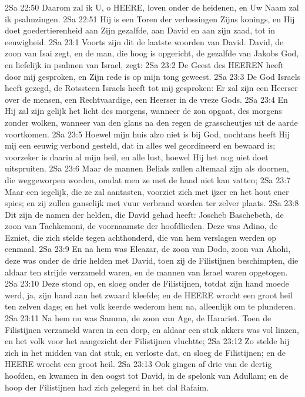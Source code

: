 2Sa 22:50  Daarom zal ik U, o HEERE, loven onder de heidenen, en Uw Naam zal ik psalmzingen.
2Sa 22:51  Hij is een Toren der verlossingen Zijns konings, en Hij doet goedertierenheid aan Zijn gezalfde, aan David en aan zijn zaad, tot in eeuwigheid.
2Sa 23:1  Voorts zijn dit de laatste woorden van David. David, de zoon van Isai zegt, en de man, die hoog is opgericht, de gezalfde van Jakobs God, en liefelijk in psalmen van Israel, zegt:
2Sa 23:2  De Geest des HEEREN heeft door mij gesproken, en Zijn rede is op mijn tong geweest.
2Sa 23:3  De God Israels heeft gezegd, de Rotssteen Israels heeft tot mij gesproken: Er zal zijn een Heerser over de mensen, een Rechtvaardige, een Heerser in de vreze Gods.
2Sa 23:4  En Hij zal zijn gelijk het licht des morgens, wanneer de zon opgaat, des morgens zonder wolken, wanneer van den glans na den regen de grasscheutjes uit de aarde voortkomen.
2Sa 23:5  Hoewel mijn huis alzo niet is bij God, nochtans heeft Hij mij een eeuwig verbond gesteld, dat in alles wel geordineerd en bewaard is; voorzeker is daarin al mijn heil, en alle lust, hoewel Hij het nog niet doet uitspruiten.
2Sa 23:6  Maar de mannen Belials zullen altemaal zijn als doornen, die weggeworpen worden, omdat men ze met de hand niet kan vatten;
2Sa 23:7  Maar een iegelijk, die ze zal aantasten, voorziet zich met ijzer en het hout ener spies; en zij zullen ganselijk met vuur verbrand worden ter zelver plaats.
2Sa 23:8  Dit zijn de namen der helden, die David gehad heeft: Joscheb Baschebeth, de zoon van Tachkemoni, de voornaamste der hoofdlieden. Deze was Adino, de Ezniet, die zich stelde tegen achthonderd, die van hem verslagen werden op eenmaal.
2Sa 23:9  En na hem was Eleazar, de zoon van Dodo, zoon van Ahohi, deze was onder de drie helden met David, toen zij de Filistijnen beschimpten, die aldaar ten strijde verzameld waren, en de mannen van Israel waren opgetogen.
2Sa 23:10  Deze stond op, en sloeg onder de Filistijnen, totdat zijn hand moede werd, ja, zijn hand aan het zwaard kleefde; en de HEERE wrocht een groot heil ten zelven dage; en het volk keerde wederom hem na, alleenlijk om te plunderen.
2Sa 23:11  Na hem nu was Samma, de zoon van Age, de Harariet. Toen de Filistijnen verzameld waren in een dorp, en aldaar een stuk akkers was vol linzen, en het volk voor het aangezicht der Filistijnen vluchtte;
2Sa 23:12  Zo stelde hij zich in het midden van dat stuk, en verloste dat, en sloeg de Filistijnen; en de HEERE wrocht een groot heil.
2Sa 23:13  Ook gingen af drie van de dertig hoofden, en kwamen in den oogst tot David, in de spelonk van Adullam; en de hoop der Filistijnen had zich gelegerd in het dal Rafaim.
